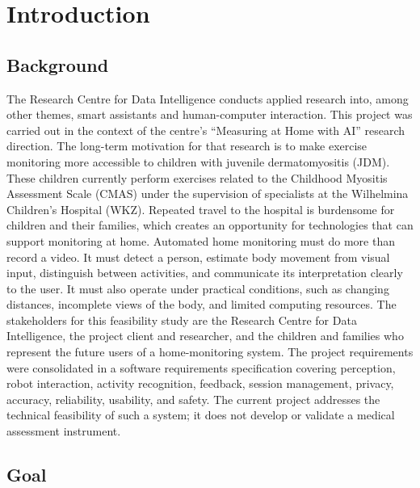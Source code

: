 \section{Introduction}

\subsection{Background}

The Research Centre for Data Intelligence conducts applied research into, among
other themes, smart assistants and human-computer interaction. This project
was carried out in the context of the centre's ``Measuring at Home with AI''
research direction. The long-term motivation for that research is to make
exercise monitoring more accessible to children with juvenile dermatomyositis
(JDM). These children currently perform exercises related to the Childhood
Myositis Assessment Scale (CMAS) under the supervision of specialists at the
Wilhelmina Children's Hospital (WKZ). Repeated travel to the hospital is
burdensome for children and their families, which creates an opportunity for
technologies that can support monitoring at home. Automated home monitoring must do more than record a video. It must detect a
person, estimate body movement from visual input, distinguish between
activities, and communicate its interpretation clearly to the user. It must
also operate under practical conditions, such as changing distances,
incomplete views of the body, and limited computing resources. The stakeholders
for this feasibility study are the Research Centre for Data Intelligence, the
project client and researcher, and the children and families who represent the
future users of a home-monitoring system. The project requirements were
consolidated in a software requirements specification covering perception,
robot interaction, activity recognition, feedback, session management, privacy,
accuracy, reliability, usability, and safety. The current project addresses the
technical feasibility of such a system; it does not develop or validate a
medical assessment instrument.

\subsection{Goal}

